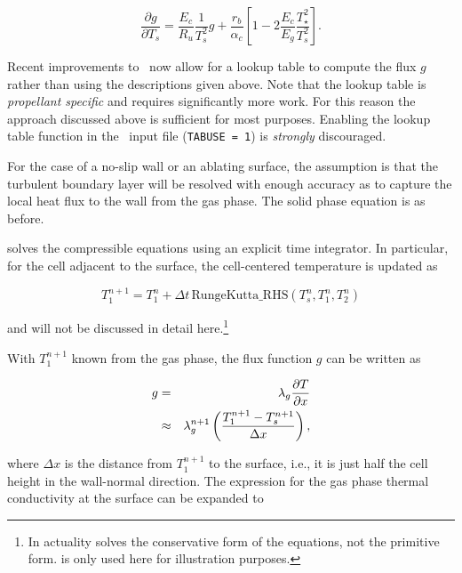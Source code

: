 \begin{equation}
\frac{\partial g}{\partial T_s} = \frac{E_c}{R_u}\frac{1}{T_s^2} g
 + \frac{r_b}{\alpha_c} \left[ 1 - 2 \frac{E_c}{E_g}\frac{T_\star^2}{T_s^2} \right].
\label{eq:dgdT}
\end{equation}

Recent improvements to \Rocburn\ now allow for a lookup table to compute the flux $g$ rather than using the descriptions given above. Note that the lookup table is \textit{propellant specific} and requires significantly more work. For this reason the approach discussed above is sufficient for most purposes. Enabling the lookup table function in the \Rocburn\ input file (\texttt{TABUSE~=~1}) is \textit{strongly} discouraged.


For the case of a no-slip wall or an ablating surface, the assumption is that the turbulent boundary layer will be resolved with enough accuracy as to capture the local heat flux to the wall from the gas phase. The solid phase equation is as before.

 solves the compressible equations using an explicit time integrator. In particular, for the cell adjacent to the surface, the cell-centered temperature is updated as

\begin{equation}
T_1^{n+1}=T_1^n + \Delta t\, \mbox{RungeKutta\_RHS}(T_s^n,T_1^n,T_2^n)
\label{eq:temp}
\end{equation}

and will not be discussed in detail here.\footnote{In actuality  solves the conservative form of the equations, not the primitive form.  is only used here for illustration purposes.}  

With $T_1^{n+1}$ known from the gas phase, the flux function $g$ can be written as

\begin{eqnarray}
g&=&\lambda_g {\partial T \over \partial x} \\
 &\approx&\lambda_g^{n+1} \left( {{T_1^{n+1}-T_s^{n+1}} \over \Delta x} \right),
\end{eqnarray}

where $\Delta x$ is the distance from $T_1^{n+1}$ to the surface, i.e., it is just half the cell height in the wall-normal direction. The expression for the gas phase thermal conductivity at the surface can be expanded to

